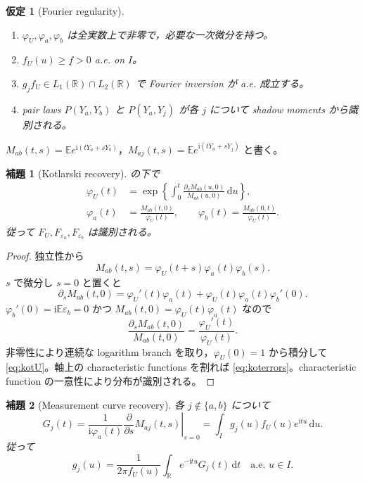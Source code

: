 \documentclass[11pt,a4paper]{ltjsarticle}
\newtheorem{assumption}{仮定}[section]
\newtheorem{lemma}{補題}[section]
\theoremstyle{remark}
\newcommand{\E}{\mathbb E}
\newcommand{\R}{\mathbb R}
\newcommand{\dd}{\,\mathrm d}
\newcommand{\ii}{\mathrm i}
\begin{document}
\begin{assumption}[Fourier regularity]\label{as:fourier}
\begin{enumerate}[label=(FR\arabic*)]
\item $\varphi_U,\varphi_a,\varphi_b$ は全実数上で非零で，必要な一次微分を持つ。
\item $f_U(u)\ge\underline f>0$ a.e. on $I$。
\item $g_jf_U\in L_1(\R)\cap L_2(\R)$ で Fourier inversion が a.e. 成立する。
\item pair laws $P(Y_a,Y_b)$ と $P(Y_a,Y_j)$ が各 $j$ について shadow moments から識別される。
\end{enumerate}
\end{assumption}

$M_{ab}(t,s)=\E e^{\ii(tY_a+sY_b)}$，$M_{aj}(t,s)=\E e^{\ii(tY_a+sY_j)}$ と書く。

\begin{lemma}[Kotlarski recovery]\label{lem:kotlarski2}
の下で
\begin{align}
\varphi_U(t)
&=\exp\left\{\int_0^t
\frac{\partial_sM_{ab}(u,0)}{M_{ab}(u,0)}\dd u\right\},
\label{eq:kotU}\\
\varphi_a(t)&=\frac{M_{ab}(t,0)}{\varphi_U(t)},
\qquad
\varphi_b(t)=\frac{M_{ab}(0,t)}{\varphi_U(t)}.
\label{eq:koterrors}
\end{align}
従って $F_U,F_{\varepsilon_a},F_{\varepsilon_b}$ は識別される。
\end{lemma}

\begin{proof}
独立性から
\[
M_{ab}(t,s)=\varphi_U(t+s)\varphi_a(t)\varphi_b(s).
\]
$s$ で微分し $s=0$ と置くと
\[
\partial_sM_{ab}(t,0)
=\varphi_U'(t)\varphi_a(t)+\varphi_U(t)\varphi_a(t)\varphi_b'(0).
\]
$\varphi_b'(0)=\ii\E\varepsilon_b=0$ かつ $M_{ab}(t,0)=\varphi_U(t)\varphi_a(t)$ なので
\[
\frac{\partial_sM_{ab}(t,0)}{M_{ab}(t,0)}
=\frac{\varphi_U'(t)}{\varphi_U(t)}.
\]
非零性により連続な logarithm branch を取り，$\varphi_U(0)=1$ から積分して \eqref{eq:kotU}。軸上の characteristic functions を割れば \eqref{eq:koterrors}。characteristic function の一意性により分布が識別される。
\end{proof}

\begin{lemma}[Measurement curve recovery]\label{lem:gcurve2}
各 $j\notin\{a,b\}$ について
\begin{equation}
G_j(t)
=\frac{1}{\ii\varphi_a(t)}
\left.\frac{\partial}{\partial s}M_{aj}(t,s)\right|_{s=0}
=\int_Ig_j(u)f_U(u)e^{\ii tu}\dd u.
\label{eq:Gj2}
\end{equation}
従って
\begin{equation}
g_j(u)
=\frac{1}{2\pi f_U(u)}
\int_{\R}e^{-\ii tu}G_j(t)\dd t
\quad\text{a.e. }u\in I.
\label{eq:gcurve2}
\end{equation}
\end{lemma}
\end{document}
